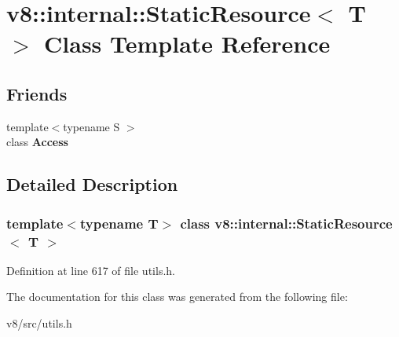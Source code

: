 \hypertarget{classv8_1_1internal_1_1StaticResource}{}\section{v8\+:\+:internal\+:\+:Static\+Resource$<$ T $>$ Class Template Reference}
\label{classv8_1_1internal_1_1StaticResource}
\subsection*{Friends}
\begin{DoxyCompactItemize}
\item 
\mbox{\label{classv8_1_1internal_1_1StaticResource_a82b51203b782e017f007b283bb1515db}} 
{\footnotesize template$<$typename S $>$ }\\class {\bfseries Access}
\end{DoxyCompactItemize}


\subsection{Detailed Description}
\subsubsection*{template$<$typename T$>$\newline
class v8\+::internal\+::\+Static\+Resource$<$ T $>$}



Definition at line 617 of file utils.\+h.



The documentation for this class was generated from the following file\+:\begin{DoxyCompactItemize}
\item 
v8/src/utils.\+h\end{DoxyCompactItemize}
